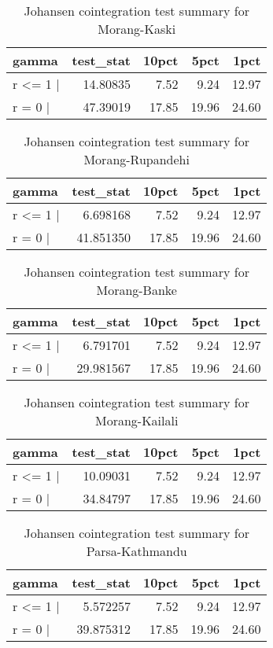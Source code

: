 \documentclass[
  12pt,
]{article}
\begin{document}
\begin{longtable}[t]{lrrrr}
\caption{\label{tab:wheat-cajo-test}Johansen cointegration test summary for Morang-Kaski}\\
\toprule
gamma & test\_stat & 10pct & 5pct & 1pct\\
\midrule
r <= 1 | & 14.80835 & 7.52 & 9.24 & 12.97\\
r = 0  | & 47.39019 & 17.85 & 19.96 & 24.60\\
\bottomrule
\end{longtable}

\begin{longtable}[t]{lrrrr}
\caption{\label{tab:wheat-cajo-test}Johansen cointegration test summary for Morang-Rupandehi}\\
\toprule
gamma & test\_stat & 10pct & 5pct & 1pct\\
\midrule
r <= 1 | & 6.698168 & 7.52 & 9.24 & 12.97\\
r = 0  | & 41.851350 & 17.85 & 19.96 & 24.60\\
\bottomrule
\end{longtable}

\begin{longtable}[t]{lrrrr}
\caption{\label{tab:wheat-cajo-test}Johansen cointegration test summary for Morang-Banke}\\
\toprule
gamma & test\_stat & 10pct & 5pct & 1pct\\
\midrule
r <= 1 | & 6.791701 & 7.52 & 9.24 & 12.97\\
r = 0  | & 29.981567 & 17.85 & 19.96 & 24.60\\
\bottomrule
\end{longtable}

\begin{longtable}[t]{lrrrr}
\caption{\label{tab:wheat-cajo-test}Johansen cointegration test summary for Morang-Kailali}\\
\toprule
gamma & test\_stat & 10pct & 5pct & 1pct\\
\midrule
r <= 1 | & 10.09031 & 7.52 & 9.24 & 12.97\\
r = 0  | & 34.84797 & 17.85 & 19.96 & 24.60\\
\bottomrule
\end{longtable}

\begin{longtable}[t]{lrrrr}
\caption{\label{tab:wheat-cajo-test}Johansen cointegration test summary for Parsa-Kathmandu}\\
\toprule
gamma & test\_stat & 10pct & 5pct & 1pct\\
\midrule
r <= 1 | & 5.572257 & 7.52 & 9.24 & 12.97\\
r = 0  | & 39.875312 & 17.85 & 19.96 & 24.60\\
\bottomrule
\end{longtable}
\end{document}
